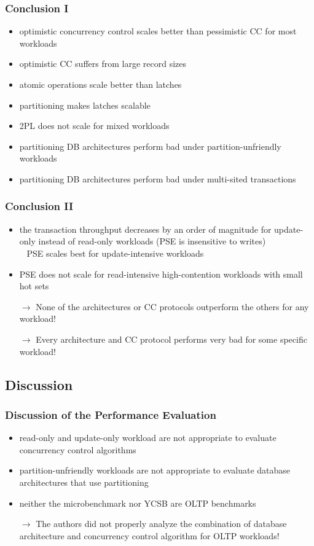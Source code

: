 \begin{frame}
	\frametitle{Conclusion I}

	\begin{itemize}
		\item	optimistic concurrency control scales better than pessimistic CC for most workloads
		\item	optimistic CC suffers from large record sizes
		\item	atomic operations scale better than latches
		\item	partitioning makes latches scalable
		\item	2PL does not scale for mixed workloads
		\item	partitioning DB architectures perform bad under partition-unfriendly workloads
		\item	partitioning DB architectures perform bad under multi-sited transactions
	\end{itemize}
\end{frame}

\begin{frame}
	\frametitle{Conclusion II}

	\begin{itemize}
		\item	the transaction throughput decreases by an order of magnitude for update-only instead of read-only workloads (PSE is insensitive to writes) \\ \bm{$\rightarrow$} PSE scales best for update-intensive workloads
		\item	PSE does not scale for read-intensive high-contention workloads with small hot sets
		\item[$\rightarrow$]	None of the architectures or CC protocols outperform the others for any workload!
		\item[$\rightarrow$]	Every architecture and CC protocol performs very bad for some specific workload!
	\end{itemize}
\end{frame}

\subsection[Discussion]{Discussion} \label{subsec:discussion}

\begin{frame}
	\frametitle{Discussion of the Performance Evaluation}

	\begin{itemize}
		\item	read-only and update-only workload are not appropriate to evaluate concurrency control algorithms
		\item	partition-unfriendly workloads are not appropriate to evaluate database architectures that use partitioning
		\item	neither the microbenchmark nor YCSB are OLTP benchmarks
		\item[$\rightarrow$]	The authors did not properly analyze the combination of database architecture and concurrency control algorithm for OLTP workloads!
	\end{itemize}
\end{frame}
